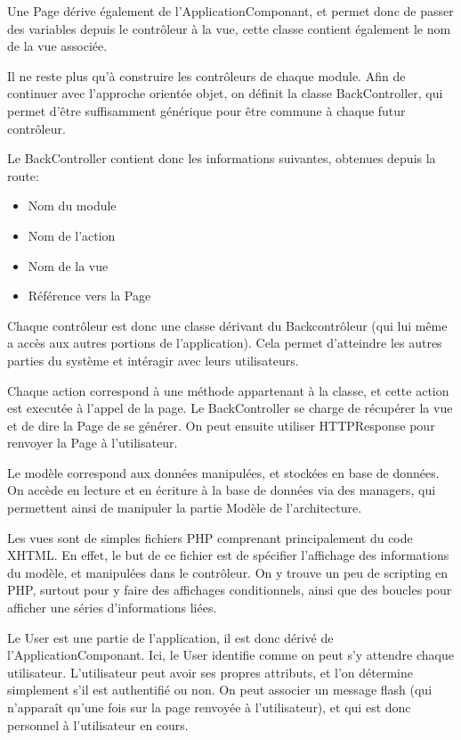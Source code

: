 Une Page dérive également de l'ApplicationComponant, et permet donc de passer des variables depuis le contrôleur à la vue,
cette classe contient également le nom de la vue associée.

Il ne reste plus qu'à construire les contrôleurs de chaque module.
Afin de continuer avec l'approche orientée objet, on définit la classe BackController, qui permet d'être
suffisamment générique pour être commune à chaque futur contrôleur.

Le BackController contient donc les informations suivantes, obtenues depuis la route:

    \begin{itemize}
    \item Nom du module
    \item Nom de l'action
    \item Nom de la vue
    \item Référence vers la Page
    \end{itemize}

Chaque contrôleur est donc une classe dérivant du Backcontrôleur (qui lui même a accès aux autres portions de l'application).
Cela permet d'atteindre les autres parties du système et intéragir avec leurs utilisateurs.

Chaque action correspond à une méthode appartenant à la classe, et cette action est executée à l'appel de la page.
Le BackController se charge de récupérer la vue et de dire la Page de se générer. On peut ensuite utiliser HTTPResponse pour
renvoyer la Page à l'utilisateur.

Le modèle correspond aux données manipulées, et stockées en base de données. On accède en lecture et en écriture à la base de données
via des managers, qui permettent ainsi de manipuler la partie Modèle de l'architecture.

Les vues sont de simples fichiers PHP comprenant principalement du code XHTML. En effet, le but de ce fichier est de spécifier
l'affichage des informations du modèle, et manipulées dans le contrôleur. On y trouve un peu de scripting en PHP, surtout
pour y faire des affichages conditionnels, ainsi que des boucles pour afficher une séries d'informations liées.

Le User est une partie de l'application, il est donc dérivé de l'ApplicationComponant. Ici, le User identifie comme on peut
s'y attendre chaque utilisateur. L'utilisateur peut avoir ses propres attributs, et l'on détermine simplement s'il est authentifié
ou non. On peut associer un message flash (qui n'apparaît qu'une fois sur la page renvoyée à l'utilisateur), et qui est donc personnel
à l'utilisateur en cours.

